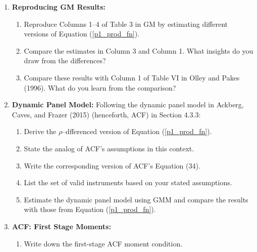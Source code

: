 \documentclass{article}
\begin{document}
\begin{enumerate}
\item \textbf{Reproducing GM Results:}

\begin{enumerate}

\item Reproduce Columns 1–4 of Table 3 in GM by estimating diﬀerent versions of
Equation (\ref{p1_prod_fn}).


\item Compare the estimates in Column 3 and Column 1. What insights do you
draw from the differences?




\item Compare these results with Column 1 of Table VI in Olley and Pakes (1996).
What do you learn from the comparison?

\end{enumerate}

\item \textbf{Dynamic Panel Model:}
Following the dynamic panel model in Ackberg, Caves, and Frazer (2015) (henceforth, ACF) in Section 4.3.3:

\begin{enumerate}
\item Derive the $\rho$–dfferenced version of Equation (\ref{p1_prod_fn}).



\item State the analog of ACF’s assumptions in this context. 



\item Write the corresponding version of ACF’s Equation (34).





\item List the set of valid instruments based on your stated assumptions.




\item Estimate the dynamic panel model using GMM and compare the results with
those from Equation (\ref{p1_prod_fn}).


\end{enumerate}


\item \textbf{ACF: First Stage Moments:}

\begin{enumerate}
\item Write down the first-stage ACF moment condition.




\end{enumerate}
\end{enumerate}
\end{document}
